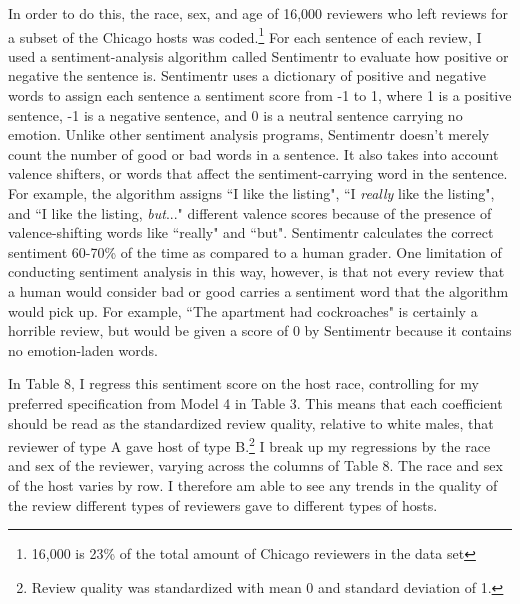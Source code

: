 In order to do this, the race, sex, and age of 16,000 reviewers who left reviews for a subset of the Chicago hosts was coded.\footnote{16,000 is 23\% of the total amount of Chicago reviewers in the data set} For each sentence of each review, I used a sentiment-analysis algorithm called Sentimentr to evaluate how positive or negative the sentence is. Sentimentr uses a dictionary of positive and negative words to assign each sentence a sentiment score from -1 to 1, where 1 is a positive sentence, -1 is a negative sentence, and 0 is a neutral sentence carrying no emotion. Unlike other sentiment analysis programs, Sentimentr doesn't merely count the number of good or bad words in a sentence. It also takes into account valence shifters, or words that affect the sentiment-carrying word in the sentence. For example, the algorithm assigns ``I like the listing", ``I \textit{really} like the listing", and ``I like the listing, \textit{but}..." different valence scores because of the presence of valence-shifting words like ``really" and ``but". Sentimentr calculates the correct sentiment 60-70\% of the time as compared to a human grader. One limitation of conducting sentiment analysis in this way, however, is that not every review that a human would consider bad or good carries a sentiment word that the algorithm would pick up. For example, ``The apartment had cockroaches" is certainly a horrible review, but would be given a score of 0 by Sentimentr because it contains no emotion-laden words. 

In Table 8, I regress this sentiment score on the host race, controlling for my preferred specification from Model 4 in Table 3. This means that each coefficient should be read as the standardized review quality, relative to white males, that reviewer of type A gave host of type B.\footnote{Review quality was standardized with mean 0 and standard deviation of 1.} I break up my regressions by the race and sex of the reviewer, varying across the columns of Table 8. The race and sex of the host varies by row. I therefore am able to see any trends in the quality of the review different types of reviewers gave to different types of hosts. 

